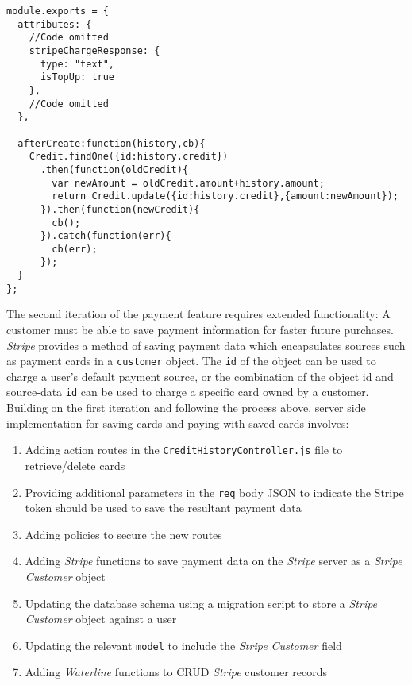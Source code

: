 \begin{listing}[H]
\begin{verbatim}
module.exports = {
  attributes: {
    //Code omitted
    stripeChargeResponse: {
      type: "text",
      isTopUp: true
    },
    //Code omitted
  },

  afterCreate:function(history,cb){
    Credit.findOne({id:history.credit})
      .then(function(oldCredit){
        var newAmount = oldCredit.amount+history.amount;
        return Credit.update({id:history.credit},{amount:newAmount});
      }).then(function(newCredit){
        cb();
      }).catch(function(err){
        cb(err);
      });
  }
};

\end{verbatim}
\label{lst:credit-history-model}
\end{listing}

The second iteration of the payment feature requires extended functionality: A customer must be able to save payment information for faster future purchases. \textit{Stripe} provides a method of saving payment data which encapsulates sources such as payment cards in a \texttt{customer} object. The \texttt{id} of the object can be used to charge a user's default payment source, or the combination of the object id and source-data \texttt{id} can be used to charge a specific card owned by a customer. Building on the first iteration and following the process above, server side implementation for saving cards and paying with saved cards involves:

\begin{enumerate}
	\item Adding action routes in the \texttt{CreditHistoryController.js} file to retrieve/delete cards
    \item Providing additional parameters in the \texttt{req} body JSON to indicate the Stripe token should be used to save the resultant payment data
    \item Adding policies to secure the new routes
    \item Adding \textit{Stripe} functions to save payment data on the \textit{Stripe} server as a \textit{Stripe Customer} object
    \item Updating the database schema using a migration script to store a \textit{Stripe Customer} object against a user
    \item Updating the relevant \texttt{model} to include the \textit{Stripe Customer}  field
    \item Adding \textit{Waterline} functions to CRUD \textit{Stripe} customer records
\end{enumerate}

